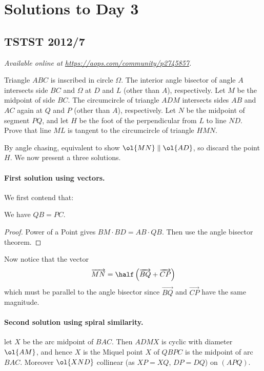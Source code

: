 \documentclass[11pt]{scrartcl}
\begin{document}
\section{Solutions to Day 3}
\subsection{TSTST 2012/7}
\textsl{Available online at \url{https://aops.com/community/p2745857}.}
\begin{mdframed}[style=mdpurplebox,frametitle={Problem statement}]
Triangle $ABC$ is inscribed in circle $\Omega$.
The interior angle bisector of angle $A$ intersects side $BC$
and $\Omega$ at $D$ and $L$ (other than $A$), respectively.
Let $M$ be the midpoint of side $BC$.
The circumcircle of triangle $ADM$ intersects sides
$AB$ and $AC$ again at $Q$ and $P$ (other than $A$), respectively.
Let $N$ be the midpoint of segment $PQ$,
and let $H$ be the foot of the perpendicular from $L$ to line $ND$.
Prove that line $ML$ is tangent to the circumcircle of triangle $HMN$.
\end{mdframed}
By angle chasing, equivalent to show $\ol{MN} \parallel \ol{AD}$,
so discard the point $H$.
We now present a three solutions.

\paragraph{First solution using vectors.}
We first contend that:
\begin{claim*}
  We have $QB = PC$.
\end{claim*}
\begin{proof}
  Power of a Point gives $BM \cdot BD = AB \cdot QB$.
  Then use the angle bisector theorem.
\end{proof}
Now notice that the vector
\[ \overrightarrow{MN}
  = \half \left( \overrightarrow{BQ} + \overrightarrow{CP} \right) \]
which must be parallel to the angle bisector
since $\overrightarrow{BQ}$ and $\overrightarrow{CP}$
have the same magnitude.


\paragraph{Second solution using spiral similarity.}
let $X$ be the arc midpoint of $BAC$.
Then $ADMX$ is cyclic with diameter $\ol{AM}$,
and hence $X$ is the Miquel point $X$ of $QBPC$
is the midpoint of arc $BAC$.
Moreover $\ol{XND}$ collinear (as $XP=XQ$, $DP=DQ$) on $(APQ)$.
\end{document}
